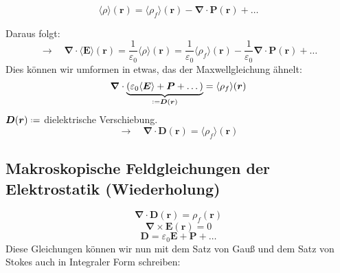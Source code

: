 \documentclass[titlepage,11pt,a4paper,ngerman]{report}
\newcommand*{\defeq}{\mathrel{\vcenter{\baselineskip0.5ex \lineskiplimit0pt \hbox{\scriptsize.}\hbox{\scriptsize.}}}=}
\newcommand{\ub}[1]{\underbrace{#1}}
\renewcommand{\vec}[1]{\boldsymbol{#1}}
\renewcommand{\epsilon}{\varepsilon}
\newcommand{\vabla}{\boldsymbol{\nabla}}
\newcommand{\frbox}[2]{\begin{tcolorbox}[colback=white,colframe=red!75!black,fonttitle=\bfseries,title=#1]#2\end{tcolorbox}}
\begin{document}
\frbox{Gemittelte makroskopische Ladungsverteilung}{
\begin{equation*}
\langle \rho \rangle (\vec{r}) = \langle \rho_f \rangle (\vec{r}) - \vabla \cdot \vec{P}(\vec{r}) + \dots
\end{equation*}
}
Daraus folgt:
\begin{equation*}
\rightarrow \quad \vabla \cdot \langle\vec{E} \rangle (\vec{r}) = \frac{1}{\epsilon_0} \langle\rho \rangle (\vec{r}) = \frac{1}{\epsilon_0} \langle \rho_f \rangle (\vec{r}) - \frac{1}{\epsilon_0} \vabla \cdot \vec{P}(\vec{r}) + \dots
\end{equation*}
Dies können wir umformen in etwas, das der Maxwellgleichung ähnelt:
\begin{equation*}
\vabla \cdot \ub{(\epsilon_0 \langle \vec{E} \rangle + \vec{P} + \dots)}_{\defeq \vec{D}(\vec{r})} = \langle \rho_f \rangle (\vec{r})
\end{equation*}
$ \vec{D}(\vec{r}) \defeq $ dielektrische Verschiebung.
\begin{equation*}
\rightarrow \quad \vabla \cdot \vec{D}(\vec{r}) = \langle \rho_f \rangle (\vec{r})
\end{equation*}

\subsection{Makroskopische Feldgleichungen der Elektrostatik \tiny(Wiederholung)}

\begin{equation*}
\vabla \cdot \vec{D}(\vec{r}) = \rho_f (\vec{r})
\end{equation*}
\begin{equation*}
\vabla \times \vec{E}(\vec{r}) = 0
\end{equation*}
\begin{equation*}
\vec{D} = \epsilon_0 \vec{E} + \vec{P} + \dots
\end{equation*}
Diese Gleichungen können wir nun mit dem Satz von Gauß und dem Satz von Stokes auch in Integraler Form schreiben:
\end{document}

